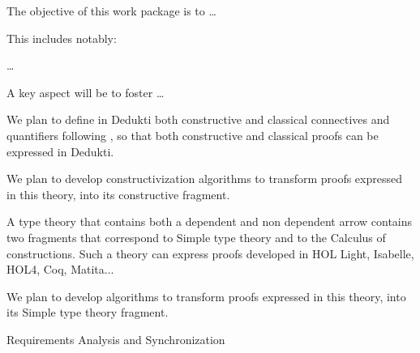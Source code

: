 \begin{workpackage}[id=reversemath,wphases=0-48,type=RTD,
  short=Reverse Math,%
  title=Reverse Math,
  lead=Lee,
  LeeRM=10]
  

\begin{wpobjectives}
  The objective of this work package is to \ldots

This includes notably:
  \begin{compactitem}
  \item \ldots
  \end{compactitem}
  A key aspect will be to foster \ldots
\end{wpobjectives}


\begin{wpdescription}
\end{wpdescription}

\begin{tasklist}
\begin{task}[id=ecumenical,title=Ecumenical Dedukti]

We plan to define in {\sc Dedukti} both constructive and classical
connectives and quantifiers
following \cite{PrawitzPereira,DowekPereira,Pereira}, so that both
constructive and classical proofs can be expressed in {\sc Dedukti}.

We plan to develop constructivization algorithms to transform proofs
expressed in this theory, into its constructive fragment.
\end{task}

\begin{task}[id=unitt,title=A universal type theory]
A type theory that contains both a dependent and non dependent arrow
contains two fragments that correspond to Simple type theory and to
the Calculus of constructions. Such a theory can express proofs
developed in HOL Light, Isabelle, HOL4, Coq, Matita...

We plan to develop algorithms to transform proofs expressed in this
theory, into its Simple type theory fragment.
\end{task}
\end{tasklist}

\begin{wpdelivs}
  \begin{wpdeliv}[due=3,miles=startup,id=requirements,dissem=PU,nature=DEM,lead=Inr]
      {Requirements Analysis and Synchronization}
\end{wpdeliv}
\end{wpdelivs}
\end{workpackage}

